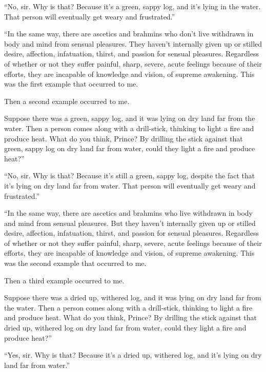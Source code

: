 \documentclass[12pt,openany]{book}%
\begin{document}
“No, sir. Why is that? Because it’s a green, sappy log, and it’s lying in the water. That person will eventually get weary and frustrated.” 

“In the same way, there are ascetics and brahmins who don’t live withdrawn in body and mind from sensual pleasures. They haven’t internally given up or stilled desire, affection, infatuation, thirst, and passion for sensual pleasures. Regardless of whether or not they suffer painful, sharp, severe, acute feelings because of their efforts, they are incapable of knowledge and vision, of supreme awakening. This was the first example that occurred to me. 

Then a second example occurred to me. 

Suppose there was a green, sappy log, and it was lying on dry land far from the water. Then a person comes along with a drill-stick, thinking to light a fire and produce heat. What do you think, Prince? By drilling the stick against that green, sappy log on dry land far from water, could they light a fire and produce heat?” 

“No, sir. Why is that? Because it’s still a green, sappy log, despite the fact that it’s lying on dry land far from water. That person will eventually get weary and frustrated.” 

“In the same way, there are ascetics and brahmins who live withdrawn in body and mind from sensual pleasures. But they haven’t internally given up or stilled desire, affection, infatuation, thirst, and passion for sensual pleasures. Regardless of whether or not they suffer painful, sharp, severe, acute feelings because of their efforts, they are incapable of knowledge and vision, of supreme awakening. This was the second example that occurred to me. 

Then a third example occurred to me. 

Suppose there was a dried up, withered log, and it was lying on dry land far from the water. Then a person comes along with a drill-stick, thinking to light a fire and produce heat. What do you think, Prince? By drilling the stick against that dried up, withered log on dry land far from water, could they light a fire and produce heat?” 

“Yes, sir. Why is that? Because it’s a dried up, withered log, and it’s lying on dry land far from water.” 
\end{document}

